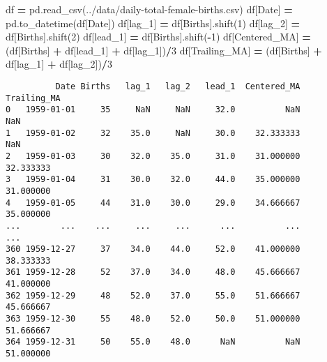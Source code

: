 \documentclass[
]{book}
\newenvironment{Shaded}{\begin{snugshade}}{\end{snugshade}}
\newcommand{\DecValTok}[1]{\textcolor[rgb]{0.00,0.00,0.81}{#1}}
\newcommand{\NormalTok}[1]{#1}
\newcommand{\OperatorTok}[1]{\textcolor[rgb]{0.81,0.36,0.00}{\textbf{#1}}}
\newcommand{\StringTok}[1]{\textcolor[rgb]{0.31,0.60,0.02}{#1}}
\begin{document}
\begin{Shaded}
\begin{Highlighting}[]
\NormalTok{df }\OperatorTok{=}\NormalTok{ pd.read\_csv(}\StringTok{\textquotesingle{}../data/daily{-}total{-}female{-}births.csv\textquotesingle{}}\NormalTok{)}
\NormalTok{df[}\StringTok{\textquotesingle{}Date\textquotesingle{}}\NormalTok{] }\OperatorTok{=}\NormalTok{ pd.to\_datetime(df[}\StringTok{\textquotesingle{}Date\textquotesingle{}}\NormalTok{])}
\NormalTok{df[}\StringTok{\textquotesingle{}lag\_1\textquotesingle{}}\NormalTok{] }\OperatorTok{=}\NormalTok{ df[}\StringTok{\textquotesingle{}Births\textquotesingle{}}\NormalTok{].shift(}\DecValTok{1}\NormalTok{)}
\NormalTok{df[}\StringTok{\textquotesingle{}lag\_2\textquotesingle{}}\NormalTok{] }\OperatorTok{=}\NormalTok{ df[}\StringTok{\textquotesingle{}Births\textquotesingle{}}\NormalTok{].shift(}\DecValTok{2}\NormalTok{)}
\NormalTok{df[}\StringTok{\textquotesingle{}lead\_1\textquotesingle{}}\NormalTok{] }\OperatorTok{=}\NormalTok{ df[}\StringTok{\textquotesingle{}Births\textquotesingle{}}\NormalTok{].shift(}\OperatorTok{{-}}\DecValTok{1}\NormalTok{)}
\NormalTok{df[}\StringTok{\textquotesingle{}Centered\_MA\textquotesingle{}}\NormalTok{] }\OperatorTok{=}\NormalTok{ (df[}\StringTok{\textquotesingle{}Births\textquotesingle{}}\NormalTok{] }\OperatorTok{+}\NormalTok{ df[}\StringTok{\textquotesingle{}lead\_1\textquotesingle{}}\NormalTok{] }\OperatorTok{+}\NormalTok{ df[}\StringTok{\textquotesingle{}lag\_1\textquotesingle{}}\NormalTok{])}\OperatorTok{/}\DecValTok{3}
\NormalTok{df[}\StringTok{\textquotesingle{}Trailing\_MA\textquotesingle{}}\NormalTok{] }\OperatorTok{=}\NormalTok{ (df[}\StringTok{\textquotesingle{}Births\textquotesingle{}}\NormalTok{] }\OperatorTok{+}\NormalTok{ df[}\StringTok{\textquotesingle{}lag\_1\textquotesingle{}}\NormalTok{] }\OperatorTok{+}\NormalTok{ df[}\StringTok{\textquotesingle{}lag\_2\textquotesingle{}}\NormalTok{])}\OperatorTok{/}\DecValTok{3}
\end{Highlighting}
\end{Shaded}

\begin{verbatim}
          Date Births   lag_1   lag_2   lead_1  Centered_MA Trailing_MA
0   1959-01-01     35     NaN     NaN     32.0          NaN         NaN
1   1959-01-02     32    35.0     NaN     30.0    32.333333         NaN 
2   1959-01-03     30    32.0    35.0     31.0    31.000000   32.333333
3   1959-01-04     31    30.0    32.0     44.0    35.000000   31.000000
4   1959-01-05     44    31.0    30.0     29.0    34.666667   35.000000
...        ...    ...     ...     ...      ...          ...         ...
360 1959-12-27     37    34.0    44.0     52.0    41.000000   38.333333
361 1959-12-28     52    37.0    34.0     48.0    45.666667   41.000000
362 1959-12-29     48    52.0    37.0     55.0    51.666667   45.666667
363 1959-12-30     55    48.0    52.0     50.0    51.000000   51.666667
364 1959-12-31     50    55.0    48.0      NaN          NaN   51.000000
\end{verbatim}
\end{document}
